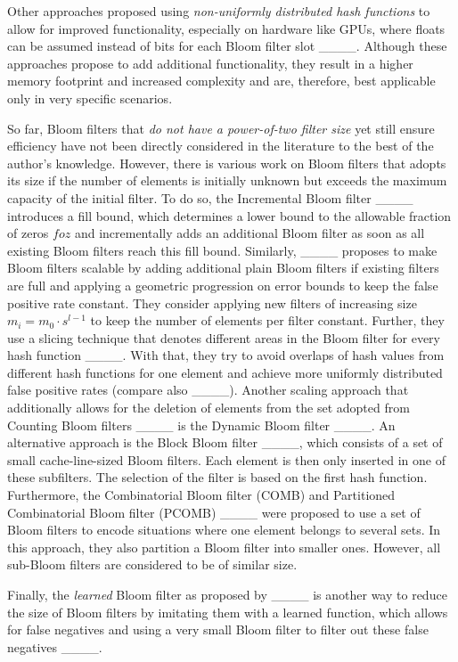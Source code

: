 Other approaches proposed using \textit{non-uniformly distributed hash functions} to allow for improved functionality, especially on hardware like GPUs, where floats can be assumed instead of bits for each Bloom filter slot ____. Although these approaches propose to add additional functionality, they result in a higher memory footprint and increased complexity and are, therefore, best applicable only in very specific scenarios.

So far, Bloom filters that \textit{do not have a power-of-two filter size} yet still ensure efficiency have not been directly considered in the literature to the best of the author's knowledge. 
However, there is various work on Bloom filters that adopts its size if the number of elements is initially unknown but exceeds the maximum capacity of the initial filter. To do so, the Incremental Bloom filter ____ introduces a fill bound, which determines a lower bound to the allowable fraction of zeros $\mathit{foz}$ and incrementally adds an additional Bloom filter as soon as all existing Bloom filters reach this fill bound. Similarly, ____ proposes to make Bloom filters scalable by adding additional plain Bloom filters if existing filters are full and applying a geometric progression on error bounds to keep the false positive rate constant. They consider applying new filters of increasing size $m_i=m_0\cdot s^{l-1}$ to keep the number of elements per filter constant. Further, they use a slicing technique that denotes different areas in the Bloom filter for every hash function ____. With that, they try to avoid overlaps of hash values from different hash functions for one element and achieve more uniformly distributed false positive 
rates (compare also ____). Another scaling approach that additionally allows for the deletion of elements from the set adopted from Counting Bloom filters ____ is the Dynamic Bloom filter ____. 
An alternative approach is the Block Bloom filter ____, which consists of a set of small cache-line-sized Bloom filters. Each element is then only inserted in one of these subfilters. The selection of the filter is based on the first hash function. 
Furthermore, the Combinatorial Bloom filter (COMB) and Partitioned Combinatorial Bloom filter  (PCOMB) ____ were proposed to use a set of Bloom filters to encode situations where one element belongs to several sets. In this approach, they also partition a Bloom filter into smaller ones. However, all sub-Bloom filters are considered to be of similar size. 

Finally, the \textit{learned} Bloom filter as proposed by ____ is another way to reduce the size of Bloom filters by imitating them with a learned function, which allows for false negatives and using a very small Bloom filter to filter out these false negatives ____.